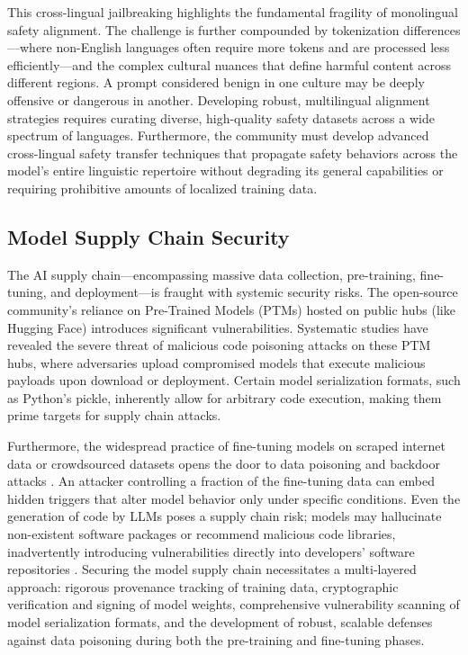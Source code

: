 \documentclass[11pt,a4paper]{article}
\begin{document}
This cross-lingual jailbreaking highlights the fundamental fragility of monolingual safety alignment. The challenge is further compounded by tokenization differences---where non-English languages often require more tokens and are processed less efficiently---and the complex cultural nuances that define harmful content across different regions. A prompt considered benign in one culture may be deeply offensive or dangerous in another. Developing robust, multilingual alignment strategies requires curating diverse, high-quality safety datasets across a wide spectrum of languages. Furthermore, the community must develop advanced cross-lingual safety transfer techniques that propagate safety behaviors across the model's entire linguistic repertoire without degrading its general capabilities or requiring prohibitive amounts of localized training data.

\subsection{Model Supply Chain Security}
The AI supply chain---encompassing massive data collection, pre-training, fine-tuning, and deployment---is fraught with systemic security risks. The open-source community's reliance on Pre-Trained Models (PTMs) hosted on public hubs (like Hugging Face) introduces significant vulnerabilities. Systematic studies have revealed the severe threat of malicious code poisoning attacks on these PTM hubs, where adversaries upload compromised models that execute malicious payloads upon download or deployment. Certain model serialization formats, such as Python's pickle, inherently allow for arbitrary code execution, making them prime targets for supply chain attacks.

Furthermore, the widespread practice of fine-tuning models on scraped internet data or crowdsourced datasets opens the door to data poisoning and backdoor attacks \cite{Hao_2024_Exploring}. An attacker controlling a fraction of the fine-tuning data can embed hidden triggers that alter model behavior only under specific conditions. Even the generation of code by LLMs poses a supply chain risk; models may hallucinate non-existent software packages or recommend malicious code libraries, inadvertently introducing vulnerabilities directly into developers' software repositories \cite{Noever_2024_AI}. Securing the model supply chain necessitates a multi-layered approach: rigorous provenance tracking of training data, cryptographic verification and signing of model weights, comprehensive vulnerability scanning of model serialization formats, and the development of robust, scalable defenses against data poisoning during both the pre-training and fine-tuning phases.
\end{document}
